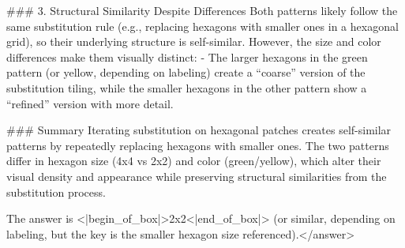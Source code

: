 ### 3. Structural Similarity Despite Differences  
Both patterns likely follow the same substitution rule (e.g., replacing hexagons with smaller ones in a hexagonal grid), so their underlying structure is self-similar. However, the size and color differences make them visually distinct:  
- The larger hexagons in the green pattern (or yellow, depending on labeling) create a “coarse” version of the substitution tiling, while the smaller hexagons in the other pattern show a “refined” version with more detail.    

### Summary  
Iterating substitution on hexagonal patches creates self-similar patterns by repeatedly replacing hexagons with smaller ones. The two patterns differ in hexagon size (4x4 vs 2x2) and color (green/yellow), which alter their visual density and appearance while preserving structural similarities from the substitution process.  

The answer is <|begin_of_box|>2x2<|end_of_box|> (or similar, depending on labeling, but the key is the smaller hexagon size referenced).</answer>